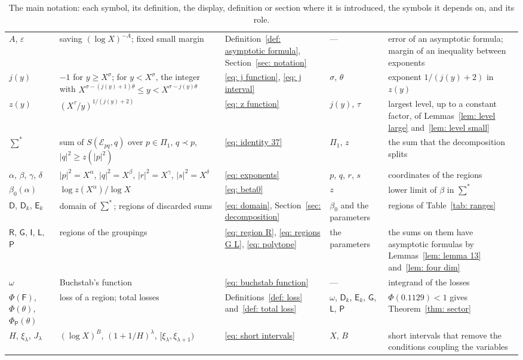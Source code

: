 \documentclass{article}
\numberwithin{equation}{section}
\newcommand{\Le}{\leqslant}
\newcommand{\Ge}{\geqslant}
\begin{document}
\begin{table}[!htbp]
\begin{tabular}{p{2.1cm}p{3.7cm}p{2.3cm}p{2.4cm}p{4.5cm}}
$A$, $\varepsilon$ & saving $(\log X)^{-A}$; fixed small margin & Definition~\ref{def: asymptotic formula}, Section~\ref{sec: notation} & --- & error of an asymptotic formula; margin of an inequality between exponents \\
$j(y)$ & $-1$ for $y \Ge X^{\sigma}$; for $y < X^{\sigma}$, the integer with $X^{\sigma - (j(y)+1)\theta} \Le y < X^{\sigma - j(y)\theta}$ & \eqref{eq: j function}, \eqref{eq: j interval} & $\sigma$, $\theta$ & exponent $1/(j(y) + 2)$ in $z(y)$ \\
$z(y)$ & $(X^{\tau}/y)^{1/(j(y) + 2)}$ & \eqref{eq: z function} & $j(y)$, $\tau$ & largest level, up to a constant factor, of Lemmas~\ref{lem: level large} and~\ref{lem: level small} \\
$\sum^*$ & sum of $S(\mathcal{E}_{pq}, q)$ over $p \in \Pi_1$, $q \prec p$, $|q|^2 \Ge z(|p|^2)$ & \eqref{eq: identity 37} & $\Pi_1$, $z$ & the sum that the decomposition splits \\
$\alpha$, $\beta$, $\gamma$, $\delta$ & $|p|^2 = X^{\alpha}$, $|q|^2 = X^{\beta}$, $|r|^2 = X^{\gamma}$, $|s|^2 = X^{\delta}$ & \eqref{eq: exponents} & $p$, $q$, $r$, $s$ & coordinates of the regions \\
$\beta_0(\alpha)$ & $\log z(X^{\alpha})/\log X$ & \eqref{eq: beta0} & $z$ & lower limit of $\beta$ in $\sum^*$ \\
$\mathsf{D}$, $\mathsf{D}_k$, $\mathsf{E}_k$ & domain of $\sum^*$; regions of discarded sums & \eqref{eq: domain}, Section~\ref{sec: decomposition} & $\beta_0$ and the parameters & regions of Table~\ref{tab: ranges} \\
$\mathsf{R}$, $\mathsf{G}$, $\mathsf{I}$, $\mathsf{L}$, $\mathsf{P}$ & regions of the groupings & \eqref{eq: region R}, \eqref{eq: regions G L}, \eqref{eq: polytope} & the parameters & the sums on them have asymptotic formulas by Lemmas~\ref{lem: lemma 13} and~\ref{lem: four dim} \\
$\omega$ & Buchstab's function & \eqref{eq: buchstab function} & --- & integrand of the losses \\
$\Phi(\mathsf{F})$, $\Phi(\theta)$, $\Phi_{\mathsf{P}}(\theta)$ & loss of a region; total losses & Definitions~\ref{def: loss} and~\ref{def: total loss} & $\omega$, $\mathsf{D}_k$, $\mathsf{E}_k$, $\mathsf{G}$, $\mathsf{L}$, $\mathsf{P}$ & $\Phi(0.1129) < 1$ gives Theorem~\ref{thm: sector} \\
$H$, $\xi_\lambda$, $J_\lambda$ & $(\log X)^B$, $(1 + 1/H)^{\lambda}$, $[\xi_\lambda, \xi_{\lambda + 1})$ & \eqref{eq: short intervals} & $X$, $B$ & short intervals that remove the conditions coupling the variables \\
\bottomrule
\end{tabular}
\caption{The main notation: each symbol, its definition, the display, definition or section where it is introduced, the symbols it depends on, and its role.}
\label{tab: notation}
\end{table}
\end{document}
